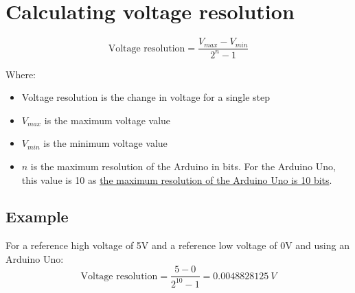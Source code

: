 \documentclass[11pt]{article}
\begin{document}
 \newpage

\section{Calculating voltage resolution}
\label{sec:org5cd2fad}
\[\text{Voltage resolution} = \frac{V_{max} - V_{min}}{2^n - 1}\]

Where:
\begin{itemize}
\item Voltage resolution is the change in voltage for a single step
\item \(V_{max}\) is the maximum voltage value
\item \(V_{min}\) is the minimum voltage value
\item \(n\) is the maximum resolution of the Arduino in bits. For the Arduino Uno, this value is 10 as \href{https://www.arduino.cc/reference/en/language/functions/analog-io/analogread/}{the maximum resolution of the Arduino Uno is 10 bits}.
\end{itemize}

\subsection{Example}
\label{sec:org62a04a4}
For a reference high voltage of 5V and a reference low voltage of 0V and using an Arduino Uno:
\[\text{Voltage resolution} = \frac{5 - 0}{2^{10} - 1} = \qty{0.0048828125}{V}\]

 \newpage
\end{document}
